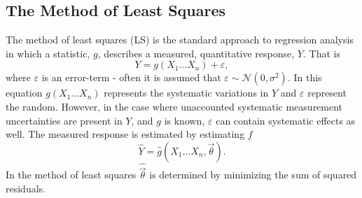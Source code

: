 \subsection{The Method of Least Squares}
The method of least squares (LS) is the standard approach to regression analysis in which a statistic, $g$, describes a measured, quantitative response, $Y$. That is
\begin{equation}
	Y=g(X_1\dots X_n)+\varepsilon,
\end{equation}  
where $\varepsilon$ is an error-term - often it is assumed that $\varepsilon\sim\mathcal{N}(0,\sigma^2)$. In this equation $g(X_1\dots X_n)$ represents the systematic variations in $Y$ and $\varepsilon$ represent the random. However, in the case where unaccounted systematic measurement uncertainties are present in $Y$, and $g$ is known, $\varepsilon$ can contain systematic effects as well. The measured response is estimated by estimating $f$
\begin{equation}
	\hat{Y}=\hat{g}(X_1\dots X_n,\vec{\theta}).
\end{equation}
In the method of least squares $\hat{\vec{\theta}}$ is determined by minimizing the sum of squared residuals. 

